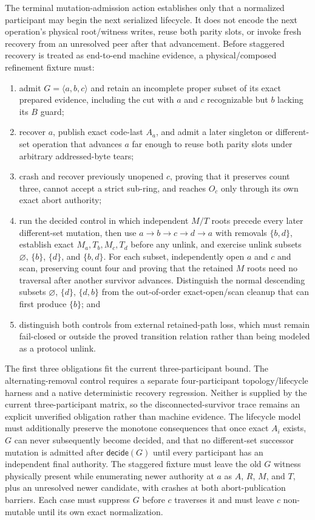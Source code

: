 \documentclass[10pt,twocolumn]{article}
\theoremstyle{remark}
\begin{document}
The terminal mutation-admission action establishes only that a normalized participant may begin the
next serialized lifecycle. It does not encode the next operation's physical root/witness writes,
reuse both parity slots, or invoke fresh recovery from an unresolved peer after that advancement.
Before staggered recovery is treated as end-to-end machine evidence, a physical/composed refinement
fixture must:
\begin{enumerate}
  \item admit $G=\langle a,b,c\rangle$ and retain an incomplete proper subset of its exact prepared
  evidence, including the cut with $a$ and $c$ recognizable but $b$ lacking its $B$ guard;
  \item recover $a$, publish exact code-last $A_a$, and admit a later singleton or different-set
  operation that advances $a$ far enough to reuse both parity slots under arbitrary addressed-byte
  tears;
  \item crash and recover previously unopened $c$, proving that it preserves count three, cannot
  accept a strict sub-ring, and reaches $O_c$ only through its own exact abort authority;
  \item run the decided control in which independent $M/T$ roots precede every later different-set
  mutation, then use $a\to b\to c\to d\to a$ with removals $\{b,d\}$, establish exact
  $M_a,T_b,M_c,T_d$ before any unlink, and exercise unlink subsets $\varnothing$, $\{b\}$,
  $\{d\}$, and $\{b,d\}$. For each subset, independently open $a$ and $c$ and scan, preserving
  count four and proving that the retained $M$ roots need no traversal after another survivor
  advances. Distinguish the normal descending subsets $\varnothing$, $\{d\}$, $\{d,b\}$ from the
  out-of-order exact-open/scan cleanup that can first produce $\{b\}$; and
  \item distinguish both controls from external retained-path loss, which must remain fail-closed or
  outside the proved transition relation rather than being modeled as a protocol unlink.
\end{enumerate}
The first three obligations fit the current three-participant bound. The alternating-removal control
requires a separate four-participant topology/lifecycle harness and a native deterministic recovery
regression. Neither is supplied by the current three-participant matrix, so the disconnected-survivor
trace remains an explicit unverified obligation rather than machine evidence. The lifecycle model
must additionally preserve the monotone consequences that once exact $A_i$ exists, $G$ can never
subsequently become decided, and that no different-set successor mutation is admitted after
$\mathsf{decide}(G)$ until every participant has an independent final authority.
The staggered fixture must leave the old $G$ witness physically present while enumerating newer
authority at $a$ as $A$, $R$, $M$, and $T$, plus an unresolved newer candidate, with crashes at both
abort-publication barriers. Each case must suppress $G$ before $c$ traverses it and must leave $c$
non-mutable until its own exact normalization.
\end{document}
